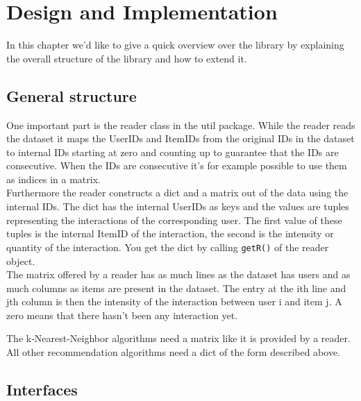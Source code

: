 
\chapter{Design and Implementation}
In this chapter we'd like to give a quick overview over the library
by explaining the overall structure of the library and how to extend it.


\section{General structure}
One important part is the reader class in the util package.
While the reader reads the dataset it maps the UserIDs and 
ItemIDs from the original IDs in the dataset to internal IDs 
starting at zero and counting up to guarantee that the IDs are consecutive. 
When the IDs are consecutive it's for example possible to use them as
indices in a matrix. \\Furthermore the reader constructs a dict and a matrix
out of the data using the internal IDs. The dict has the internal 
UserIDs as keys and the values are tuples representing the 
interactions of the corresponding user. The first value of these tuples is the internal
ItemID of the interaction, the second is the intensity or
quantity of the interaction. You get the dict by calling \lstinline!getR()!
of the reader object.\\
The matrix offered by a reader has as much lines as the dataset
has users and as much columns as items are present in the dataset.
The entry at the ith line and jth column is then the intensity of the interaction
between user i and item j. A zero means that there hasn't been any
interaction yet.

The k-Nearest-Neighbor algorithms need a matrix like it is provided by a
reader. All other recommendation algorithms need a dict of the 
form described above.

\section{Interfaces}


